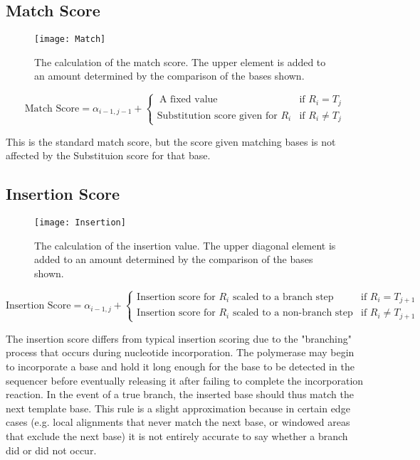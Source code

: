 \documentclass[paper=a4, fontsize=11pt]{scrartcl}
\numberwithin{equation}{section}		%
\numberwithin{figure}{section}			%
\numberwithin{table}{section}				%
\begin{document}
\subsection{\textbf{Match Score}}

\begin{figure}[H] %
	\texttt{[image: Match]}
		\caption{The calculation of the match score.  The upper element is added to an amount determined by the comparison of the bases shown.}
\end{figure}
\[
	\text{Match Score} = \alpha_{i-1,j-1}  +  \begin{cases}
							 \ \text{A fixed value} & \text{if }  R_{i} = T_{j} \\
							 \text{Substitution score given for } R_{i} & \text{if }  R_{i}  \neq T_{j} 
							 \end{cases}
\]

This is the standard match score, but the score given matching bases is not affected by the Substituion score for that base.  


\subsection{\textbf{Insertion Score}}

\begin{figure}[H] %
	\texttt{[image: Insertion]}
		\caption{The calculation of the insertion value.  The upper diagonal element is added to an amount determined by the comparison of the bases shown.}
\end{figure}

\[
	\text{Insertion Score} = \alpha_{i-1,j}  +  \begin{cases}
							 \text{Insertion score  for } R_{i} \text{ scaled to a branch step} & \text{if }  R_{i} = T_{j+1} \\
							 \text{Insertion score  for } R_{i} \text{ scaled to a non-branch step} & \text{if }  R_{i}  \neq T_{j+1} 
							 \end{cases}
\]


The insertion score differs from typical insertion scoring due to the "branching" process that occurs during nucleotide incorporation.  The polymerase may begin to incorporate a base and hold it long enough for the base to be detected in the sequencer before eventually releasing it after failing to complete the incorporation reaction.  In the event of a true branch, the inserted base should thus match the next template base.  This rule is a slight approximation because in certain edge cases (e.g. local alignments that never match the next base, or windowed areas that exclude the next base) it is not entirely accurate to say whether a branch did or did not occur.
\end{document}
